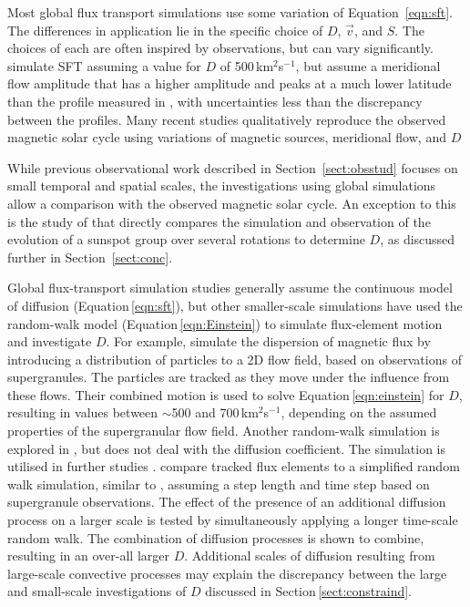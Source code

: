 Most global flux transport simulations use some variation of Equation~\ref{eqn:sft}. The differences in application lie in the specific choice of $D$, $\vec{v}$, and $S$. The choices of each are often inspired by observations, but can vary significantly.
\cite{Wang:2009} simulate \gls{SFT} assuming a value for $D$ of 500\,km$^2$s$^{-1}$, but assume a meridional flow amplitude that has a higher amplitude and peaks at a much lower latitude than the profile measured in \cite{Hathaway:2011}, with uncertainties less than the discrepancy between the profiles. 
Many recent studies qualitatively reproduce the observed magnetic solar cycle using variations of magnetic sources, meridional flow, and $D$ \citep{Wang:1989,Dikpati:2004,Schrijver:2008b}

While previous observational work described in Section~\ref{sect:obsstud} focuses on small temporal and spatial scales, the investigations using global simulations allow a comparison with the observed magnetic solar cycle. %
An exception to this is the study of \cite{Wang:1989} that directly compares the simulation and observation of the evolution of a sunspot group over several rotations to determine $D$, as discussed further in Section~\ref{sect:conc}.

Global flux-transport simulation studies generally assume the continuous model of diffusion (Equation\,\ref{eqn:sft}), but other smaller-scale simulations have used the random-walk model (Equation\,\ref{eqn:Einstein}) to simulate flux-element motion and investigate $D$. For example, \cite{Simon:1995} simulate the dispersion of magnetic flux by introducing a distribution of particles to a 2D flow field, based on observations of supergranules. The particles are tracked as they move under the influence from these flows. Their combined motion is used to solve Equation\,\ref{eqn:einstein} for $D$, resulting in values between $\sim$500 and 700\,km$^2$s$^{-1}$, depending on the assumed properties of the supergranular flow field.
Another random-walk simulation is explored in \cite{Schrijver:1997b}, but does not deal with the diffusion coefficient. The simulation is utilised in further studies \citep{Schrijver:2001,Schrijver:2003,Schrijver:2008b}.
\cite{Hagenaar:1999} compare tracked flux elements to a simplified random walk simulation, similar to \cite{Simon:1995},  assuming a step length and time step based on supergranule observations. The effect of the presence of an additional diffusion process on a larger scale is tested by simultaneously applying a longer time-scale random walk. The combination of diffusion processes is shown to combine, resulting in an over-all larger $D$. Additional scales of diffusion resulting from large-scale convective processes may explain the discrepancy between the large and small-scale investigations of $D$ discussed in Section\,\ref{sect:constraind}.



